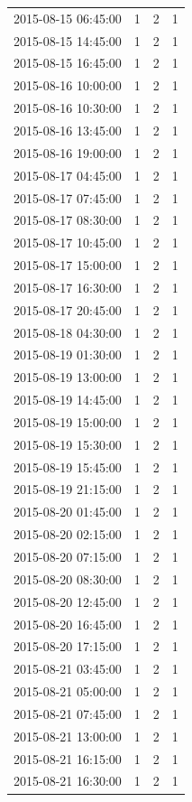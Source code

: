 \begin{tabular}{lrrr}
2015-08-15 06:45:00 & 1 & 2 & 1 \\
2015-08-15 14:45:00 & 1 & 2 & 1 \\
2015-08-15 16:45:00 & 1 & 2 & 1 \\
2015-08-16 10:00:00 & 1 & 2 & 1 \\
2015-08-16 10:30:00 & 1 & 2 & 1 \\
2015-08-16 13:45:00 & 1 & 2 & 1 \\
2015-08-16 19:00:00 & 1 & 2 & 1 \\
2015-08-17 04:45:00 & 1 & 2 & 1 \\
2015-08-17 07:45:00 & 1 & 2 & 1 \\
2015-08-17 08:30:00 & 1 & 2 & 1 \\
2015-08-17 10:45:00 & 1 & 2 & 1 \\
2015-08-17 15:00:00 & 1 & 2 & 1 \\
2015-08-17 16:30:00 & 1 & 2 & 1 \\
2015-08-17 20:45:00 & 1 & 2 & 1 \\
2015-08-18 04:30:00 & 1 & 2 & 1 \\
2015-08-19 01:30:00 & 1 & 2 & 1 \\
2015-08-19 13:00:00 & 1 & 2 & 1 \\
2015-08-19 14:45:00 & 1 & 2 & 1 \\
2015-08-19 15:00:00 & 1 & 2 & 1 \\
2015-08-19 15:30:00 & 1 & 2 & 1 \\
2015-08-19 15:45:00 & 1 & 2 & 1 \\
2015-08-19 21:15:00 & 1 & 2 & 1 \\
2015-08-20 01:45:00 & 1 & 2 & 1 \\
2015-08-20 02:15:00 & 1 & 2 & 1 \\
2015-08-20 07:15:00 & 1 & 2 & 1 \\
2015-08-20 08:30:00 & 1 & 2 & 1 \\
2015-08-20 12:45:00 & 1 & 2 & 1 \\
2015-08-20 16:45:00 & 1 & 2 & 1 \\
2015-08-20 17:15:00 & 1 & 2 & 1 \\
2015-08-21 03:45:00 & 1 & 2 & 1 \\
2015-08-21 05:00:00 & 1 & 2 & 1 \\
2015-08-21 07:45:00 & 1 & 2 & 1 \\
2015-08-21 13:00:00 & 1 & 2 & 1 \\
2015-08-21 16:15:00 & 1 & 2 & 1 \\
2015-08-21 16:30:00 & 1 & 2 & 1 \\

\end{tabular}

